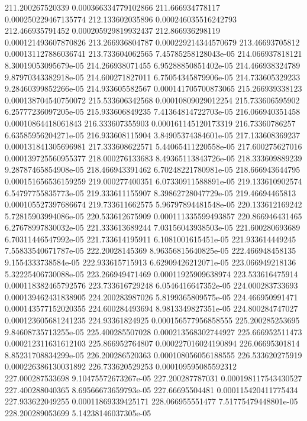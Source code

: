 {211.200267520339 0.000366334779102866
211.666934778117 0.000250229467135774
212.133602035896 0.000246035516242793
212.466935791452 0.000205929819932437
212.866936298119 0.000121493607870826
213.266936804787 0.000229214344570679
213.46693705812 0.000131127886036741
213.733604062565 7.45785258128043e-05
214.066937818121 8.30019053095679e-05
214.266938071455 6.95288850851402e-05
214.466938324789 9.87970343382918e-05
214.600271827011 6.75054345879906e-05
214.733605329233 9.28460399852266e-05
214.933605582567 0.000141705700873065
215.266939338123 0.000138704540750072
215.533606342568 0.00010809029012254
215.733606595902 6.25777236097205e-05
215.933606849235 7.41364814722703e-05
216.066940351458 0.00010864418061843
216.333607355903 0.000161145120173319
216.73360786257 6.63585956204271e-05
216.933608115904 3.84905374384601e-05
217.133608369237 0.000131841305696981
217.333608622571 5.44065411220558e-05
217.600275627016 0.000139725560955377
218.000276133683 8.49365113843726e-05
218.333609889239 9.28787465854908e-05
218.466943391462 6.70248221780981e-05
218.666943644795 0.000151656536159259
219.000277400351 6.07330911588891e-05
219.133610902574 6.54797755835773e-05
219.333611155907 8.39862728047729e-05
219.46694465813 0.000105527397686674
219.733611662575 5.96797894481548e-05
220.133612169242 5.72815903994086e-05
220.533612675909 0.000111335599493857
220.866946431465 6.27678997830032e-05
221.333613689244 7.03156043938503e-05
221.600280693689 6.70311446547992e-05
221.733614195911 6.1081001615451e-05
221.933614449245 7.55833540671787e-05
222.20028145369 8.96356815640825e-05
222.466948458135 9.1554333738584e-05
222.933615715913 6.62909426212071e-05
223.066949218136 5.32225406730088e-05
223.266949471469 0.00011925909638974
223.533616475914 0.000118382465792576
223.733616729248 6.0546416647352e-05
224.000283733693 0.000139462431838905
224.200283987026 5.8199365809575e-05
224.466950991471 0.000143577152020355
224.600284493694 8.9813349827351e-05
224.800284747027 0.000123605681241235
224.93361824925 0.000156577956858555
225.200285253695 9.84608735713255e-05
225.400285507028 0.000213568302744927
225.666952511473 0.000212311631612103
225.866952764807 0.000227016024190894
226.06695301814 8.85231708834299e-05
226.200286520363 0.000108056056188555
226.533620275919 0.000226386130031892
226.733620529253 0.000109595085592312
227.000287533698 9.10475572673267e-05
227.200287787031 0.000198117543430527
227.400288040365 8.69566673659793e-05
227.66695504481 0.000115420411775434
227.933622049255 0.00011869339425171
228.066955551477 7.51775479448801e-05
228.200289053699 5.14238146037305e-05
}
